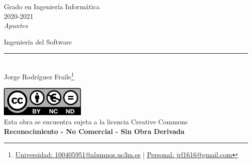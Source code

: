 \documentclass[12pt, twoside, openright]{report} %
\begin{document}
	
\begin{titlepage}
	\begin{sffamily}
	\color{azulUC3M}
	\begin{center}
		\begin{figure}[H] %
		\end{figure}
		\vspace{2.5cm}
		\begin{Large}
			Grado en Ingeniería Informática\\			
			2020-2021\\
			\vspace{2cm}		
			\textsl{Apuntes}\\
			\bigskip
		\end{Large}
		 	{\Huge Ingeniería del Software}\\
		 	\vspace*{0.5cm}
	 		\rule{10.5cm}{0.1mm}\\
			\vspace*{0.9cm}
			{\LARGE Jorge Rodríguez Fraile\footnote{\href{mailto:100405951@alumnos.uc3m.es}{Universidad: 100405951@alumnos.uc3m.es}  |  \href{mailto:jrf1616@gmail.com}{Personal: jrf1616@gmail.com}}}\\ 
			\vspace*{1cm}
	\end{center}
	\vfill
	\color{black}
		\includegraphics[width=4.2cm]{img/creativecommons.png}\\
		Esta obra se encuentra sujeta a la licencia Creative Commons\\ \textbf{Reconocimiento - No Comercial - Sin Obra Derivada}
	\end{sffamily}
\end{titlepage}


\tableofcontents
\thispagestyle{fancy}
\end{document}
